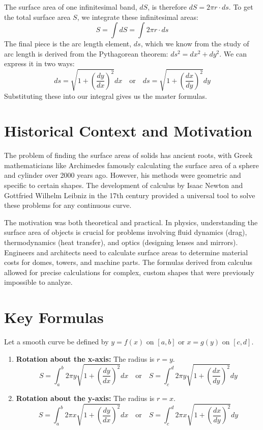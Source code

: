\documentclass{article}
\begin{document}
The surface area of one infinitesimal band, \(dS\), is therefore \(dS = 2\pi r \cdot ds\). To get the total surface area \(S\), we integrate these infinitesimal areas:
\[ S = \int dS = \int 2\pi r \cdot ds \]
The final piece is the arc length element, \(ds\), which we know from the study of arc length is derived from the Pythagorean theorem: \(ds^2 = dx^2 + dy^2\). We can express it in two ways:
\[ ds = \sqrt{1 + \left(\frac{dy}{dx}\right)^2} dx \quad \text{or} \quad ds = \sqrt{1 + \left(\frac{dx}{dy}\right)^2} dy \]
Substituting these into our integral gives us the master formulas.

\section{Historical Context and Motivation}
The problem of finding the surface areas of solids has ancient roots, with Greek mathematicians like Archimedes famously calculating the surface area of a sphere and cylinder over 2000 years ago. However, his methods were geometric and specific to certain shapes. The development of calculus by Isaac Newton and Gottfried Wilhelm Leibniz in the 17th century provided a universal tool to solve these problems for any continuous curve.

The motivation was both theoretical and practical. In physics, understanding the surface area of objects is crucial for problems involving fluid dynamics (drag), thermodynamics (heat transfer), and optics (designing lenses and mirrors). Engineers and architects need to calculate surface areas to determine material costs for domes, towers, and machine parts. The formulas derived from calculus allowed for precise calculations for complex, custom shapes that were previously impossible to analyze.

\section{Key Formulas}
Let a smooth curve be defined by \(y = f(x)\) on \([a, b]\) or \(x = g(y)\) on \([c, d]\).
\begin{enumerate}
    \item \textbf{Rotation about the x-axis:} The radius is \(r=y\).
    \[ S = \int_{a}^{b} 2\pi y \sqrt{1 + \left(\frac{dy}{dx}\right)^2} dx \quad \text{or} \quad S = \int_{c}^{d} 2\pi y \sqrt{1 + \left(\frac{dx}{dy}\right)^2} dy \]

    \item \textbf{Rotation about the y-axis:} The radius is \(r=x\).
    \[ S = \int_{a}^{b} 2\pi x \sqrt{1 + \left(\frac{dy}{dx}\right)^2} dx \quad \text{or} \quad S = \int_{c}^{d} 2\pi x \sqrt{1 + \left(\frac{dx}{dy}\right)^2} dy \]
\end{enumerate}
\end{document}
